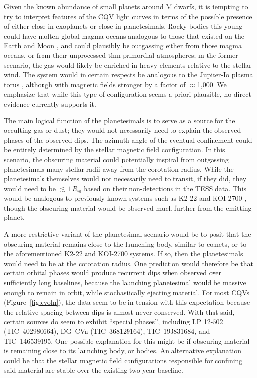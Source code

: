 \documentclass[11pt,twocolumn,tighten]{aastex63}
\begin{document}
Given the known abundance of small planets around M dwarfs, it is
tempting to try to interpret features of the CQV light curves in terms
of the possible presence of either close-in exoplanets or close-in
planetesimals.  Rocky bodies this young could have molten global magma
oceans analogous to those that existed on the Earth and Moon
\citep[see][]{2022arXiv220310023L}, and could plausibly be outgassing
either from those magma oceans, or from their unprocessed thin
primordial atmospheres; in the former scenario, the gas would likely
be enriched in heavy elements relative to the stellar wind.  The
system would in certain respects be analogous to the Jupiter-Io plasma
torus \citep[e.g.][]{2004jpsm.book..537S}, although with magnetic
fields stronger by a factor of $\approx$1{,}000.  We emphasize that
while this type of configuration seems a priori plausible, no direct
evidence currently supports it.

The main logical function of the planetesimals is to serve as a source
for the occulting gas or dust; they would not necessarily need to
explain the observed phases of the observed dips.  The azimuth angle
of the eventual confinement could be entirely determined by the
stellar magnetic field configuration.  In this scenario, the obscuring
material could potentially inspiral from outgassing planetesimals many
stellar radii away from the corotation radius.  While the
planetesimals themselves would not necessarily need to transit, if
they did, they would need to be $\lesssim 1$\,$R_\oplus$ based on
their non-detections in the TESS data.  This would be analogous to
previously known systems such as K2-22 \citep{2015ApJ...812..112S} and
KOI-2700 \citep{2014ApJ...784...40R}, though the obscuring material
would be observed much further from the emitting planet.  

A more restrictive variant of the planetesimal scenario would be to
posit that the obscuring material remains close to the launching body,
similar to comets, or to the aforementioned K2-22 and KOI-2700
systems.  If so, then the planetesimals would need to be at the
corotation radius.  One prediction would therefore be that certain
orbital phases would produce recurrent dips when observed over
sufficiently long baselines, because the launching planetesimal would
be massive enough to remain in orbit, while stochastically ejecting
material.  For most CQVs (Figure~\ref{fig:evoln}), the data seem to be
in tension with this expectation because the relative spacing between
dips is almost never conserved.  With that said, certain sources do
seem to exhibit ``special phases'', including LP 12-502
(TIC~402980664), DG~CVn (TIC~368129164), TIC~193831684, and
TIC~146539195.  One possible explanation for this might be if
obscuring material is remaining close to its launching body, or
bodies.  An alternative explanation could be that the stellar magnetic
field configurations responsible for confining said material are
stable over the existing two-year baseline.
\end{document}
